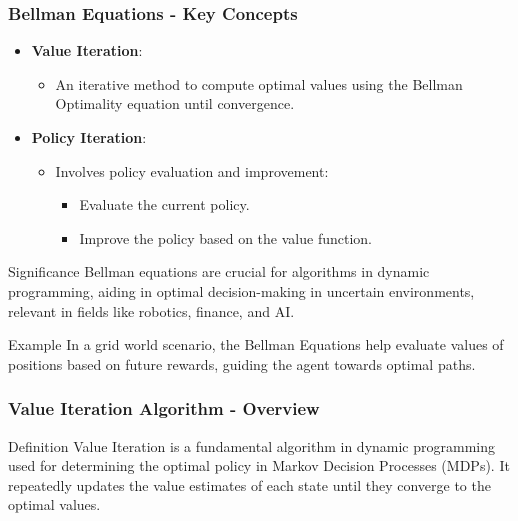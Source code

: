 \documentclass[aspectratio=169]{beamer}
\begin{document}
\begin{frame}[fragile]
    \frametitle{Bellman Equations - Key Concepts}
    \begin{itemize}
        \item \textbf{Value Iteration}:
            \begin{itemize}
                \item An iterative method to compute optimal values using the Bellman Optimality equation until convergence.
            \end{itemize}
        \item \textbf{Policy Iteration}:
            \begin{itemize}
                \item Involves policy evaluation and improvement:
                    \begin{itemize}
                        \item Evaluate the current policy.
                        \item Improve the policy based on the value function.
                    \end{itemize}
            \end{itemize}
    \end{itemize}
    
    \begin{block}{Significance}
        Bellman equations are crucial for algorithms in dynamic programming, aiding in optimal decision-making in uncertain environments, relevant in fields like robotics, finance, and AI.
    \end{block}
    
    \begin{block}{Example}
        In a grid world scenario, the Bellman Equations help evaluate values of positions based on future rewards, guiding the agent towards optimal paths.
    \end{block}
\end{frame}

\begin{frame}[fragile]
    \frametitle{Value Iteration Algorithm - Overview}
    \begin{block}{Definition}
        Value Iteration is a fundamental algorithm in dynamic programming used for determining the optimal policy in Markov Decision Processes (MDPs). It repeatedly updates the value estimates of each state until they converge to the optimal values.
    \end{block}
\end{frame}
\end{document}
